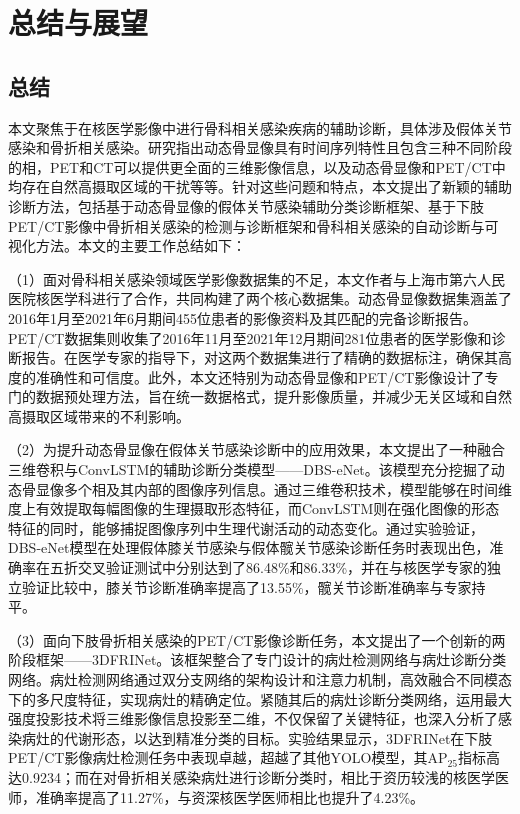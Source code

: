 \chapter{总结与展望}

\section{总结}

本文聚焦于在核医学影像中进行骨科相关感染疾病的辅助诊断，具体涉及假体关节感染和骨折相关感染。研究指出动态骨显像具有时间序列特性且包含三种不同阶段的相，PET和CT可以提供更全面的三维影像信息，以及动态骨显像和PET/CT中均存在自然高摄取区域的干扰等等。针对这些问题和特点，本文提出了新颖的辅助诊断方法，包括基于动态骨显像的假体关节感染辅助分类诊断框架、基于下肢PET/CT影像中骨折相关感染的检测与诊断框架和骨科相关感染的自动诊断与可视化方法。本文的主要工作总结如下：

（1）面对骨科相关感染领域医学影像数据集的不足，本文作者与上海市第六人民医院核医学科进行了合作，共同构建了两个核心数据集。动态骨显像数据集涵盖了2016年1月至2021年6月期间455位患者的影像资料及其匹配的完备诊断报告。PET/CT数据集则收集了2016年11月至2021年12月期间281位患者的医学影像和诊断报告。在医学专家的指导下，对这两个数据集进行了精确的数据标注，确保其高度的准确性和可信度。此外，本文还特别为动态骨显像和PET/CT影像设计了专门的数据预处理方法，旨在统一数据格式，提升影像质量，并减少无关区域和自然高摄取区域带来的不利影响。

（2）为提升动态骨显像在假体关节感染诊断中的应用效果，本文提出了一种融合三维卷积与ConvLSTM的辅助诊断分类模型——DBS-eNet。该模型充分挖掘了动态骨显像多个相及其内部的图像序列信息。通过三维卷积技术，模型能够在时间维度上有效提取每幅图像的生理摄取形态特征，而ConvLSTM则在强化图像的形态特征的同时，能够捕捉图像序列中生理代谢活动的动态变化。通过实验验证，DBS-eNet模型在处理假体膝关节感染与假体髋关节感染诊断任务时表现出色，准确率在五折交叉验证测试中分别达到了86.48\%和86.33\%，并在与核医学专家的独立验证比较中，膝关节诊断准确率提高了13.55\%，髋关节诊断准确率与专家持平。

（3）面向下肢骨折相关感染的PET/CT影像诊断任务，本文提出了一个创新的两阶段框架——3DFRINet。该框架整合了专门设计的病灶检测网络与病灶诊断分类网络。病灶检测网络通过双分支网络的架构设计和注意力机制，高效融合不同模态下的多尺度特征，实现病灶的精确定位。紧随其后的病灶诊断分类网络，运用最大强度投影技术将三维影像信息投影至二维，不仅保留了关键特征，也深入分析了感染病灶的代谢形态，以达到精准分类的目标。实验结果显示，3DFRINet在下肢PET/CT影像病灶检测任务中表现卓越，超越了其他YOLO模型，其AP\(_{25}\)指标高达0.9234；而在对骨折相关感染病灶进行诊断分类时，相比于资历较浅的核医学医师，准确率提高了11.27\%，与资深核医学医师相比也提升了4.23\%。

